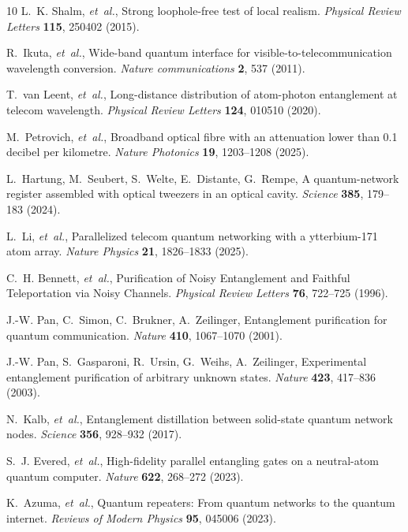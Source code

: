 \documentclass[aps,reprint,showpacs,superscriptaddress]{revtex4-2}
\begin{document}
\begin{thebibliography}{10}
L.~K. Shalm, \emph{et~al.}, Strong loophole-free test of local realism.
  \emph{Physical Review Letters} \textbf{115}, 250402 (2015).

R.~Ikuta, \emph{et~al.}, Wide-band quantum interface for
  visible-to-telecommunication wavelength conversion. \emph{Nature
  communications} \textbf{2}, 537 (2011).

T.~van Leent, \emph{et~al.}, Long-distance distribution of atom-photon
  entanglement at telecom wavelength. \emph{Physical Review Letters}
  \textbf{124}, 010510 (2020).

M.~Petrovich, \emph{et~al.}, Broadband optical fibre with an attenuation lower
  than 0.1 decibel per kilometre. \emph{Nature Photonics} \textbf{19},
  1203--1208 (2025).

L.~Hartung, M.~Seubert, S.~Welte, E.~Distante, G.~Rempe, A quantum-network
  register assembled with optical tweezers in an optical cavity. \emph{Science}
  \textbf{385}, 179--183 (2024).

L.~Li, \emph{et~al.}, Parallelized telecom quantum networking with a
  ytterbium-171 atom array. \emph{Nature Physics} \textbf{21}, 1826--1833
  (2025).

C.~H. Bennett, \emph{et~al.}, Purification of Noisy Entanglement and Faithful
  Teleportation via Noisy Channels. \emph{Physical Review Letters} \textbf{76},
  722--725 (1996).

J.-W. Pan, C.~Simon, C.~Brukner, A.~Zeilinger, Entanglement purification for
  quantum communication. \emph{Nature} \textbf{410}, 1067--1070 (2001).

J.-W. Pan, S.~Gasparoni, R.~Ursin, G.~Weihs, A.~Zeilinger, Experimental
  entanglement purification of arbitrary unknown states. \emph{Nature}
  \textbf{423}, 417--836 (2003).

N.~Kalb, \emph{et~al.}, Entanglement distillation between solid-state quantum
  network nodes. \emph{Science} \textbf{356}, 928--932 (2017).

S.~J. Evered, \emph{et~al.}, High-fidelity parallel entangling gates on a
  neutral-atom quantum computer. \emph{Nature} \textbf{622}, 268--272 (2023).

K.~Azuma, \emph{et~al.}, Quantum repeaters: {From} quantum networks to the
  quantum internet. \emph{Reviews of Modern Physics} \textbf{95}, 045006
  (2023).


\end{thebibliography}
\end{document}
